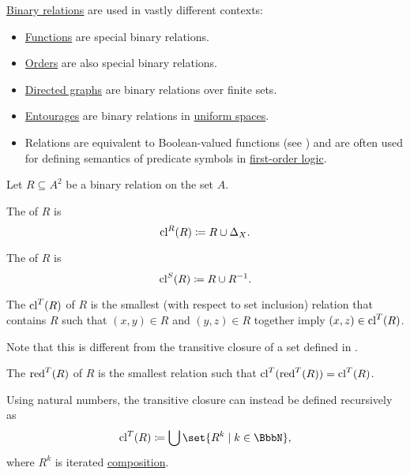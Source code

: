 \begin{example}\label{ex:relation}
  \hyperref[def:binary_relation]{Binary relations} are used in vastly different contexts:
  \begin{itemize}
    \item \hyperref[def:function]{Functions} are special binary relations.
    \item \hyperref[sec:order_theory]{Orders} are also special binary relations.
    \item \hyperref[def:directed_graph]{Directed graphs} are binary relations over finite sets.
    \item \hyperref[def:entourage]{Entourages} are binary relations in \hyperref[def:uniform_space]{uniform spaces}.
    \item Relations are equivalent to Boolean-valued functions (see ) and are often used for defining semantics of predicate symbols in \hyperref[subsec:first_order_logic]{first-order logic}.
  \end{itemize}
\end{example}

\begin{definition}\label{def:derived_relations}
  Let \( R \subseteq A^2 \) be a binary relation on the set \( A \).

  \begin{thmenum}
     The  of \( R \) is
    \begin{equation*}
      \operatorname{cl}^R(R) \coloneqq R \cup \Delta_X.
    \end{equation*}

     The  of \( R \) is
    \begin{equation*}
      \operatorname{cl}^S(R) \coloneqq R \cup R^{-1}.
    \end{equation*}

     The  \( \operatorname{cl}^T(R) \) of \( R \) is the smallest (with respect to set inclusion) relation that contains \( R \) such that \( (x, y) \in R \) and \( (y, z) \in R \) together imply \( (x, z) \in \operatorname{cl}^T(R) \).

    Note that this is different from the transitive closure of a set defined in .

    The  \( \operatorname{red}^T(R) \) of \( R \) is the smallest relation such that \( \operatorname{cl}^T(\operatorname{red}^T(R)) = \operatorname{cl}^T(R) \).

    Using natural numbers, the transitive closure can instead be defined recursively as
    \begin{equation*}
      \cl^T(R) \coloneqq \bigcup \set{ R^k \given k \in \BbbN },
    \end{equation*}
    where \( R^k \) is iterated \hyperref[def:binary_relation/composition]{composition}.
  \end{thmenum}
\end{definition}

